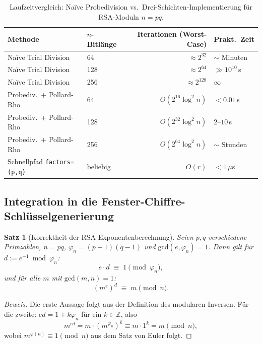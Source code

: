 ﻿\documentclass[12pt, a4paper]{article}
\theoremstyle{plain}
\newtheorem{theorem}{Satz}[section]
\theoremstyle{definition}
\theoremstyle{remark}
\newenvironment{myproof}[1][Beweis]{%
  \begin{proof}[#1]
}{%
  \end{proof}
}
\newcommand{\Z}{\mathbb{Z}}
\newcommand{\GCD}{\mathrm{gcd}}
\begin{document}
\begin{table}[H]
  \centering
  \caption{Laufzeitvergleich: Na\"ive Probedivision vs.\
           Drei-Schichten-Implementierung f\"ur RSA-Moduln $n = pq$.}
  \label{tab:phi_laufzeit}
  \begin{tabular}{llrl}
    \toprule
    Methode & $n$-Bitl\"ange & Iterationen (Worst-Case) & Prakt.\ Zeit \\
    \midrule
    Na\"ive Trial Division   & 64  & $\approx 2^{32}$ & $\sim$ Minuten \\
    Na\"ive Trial Division   & 128 & $\approx 2^{64}$ & $\gg 10^{10}$\,s \\
    Na\"ive Trial Division   & 256 & $\approx 2^{128}$ & $\infty$ \\
    \midrule
    Probediv.\ + Pollard-Rho & 64  & $O(2^{16} \log^2 n)$ & $< 0.01$\,s \\
    Probediv.\ + Pollard-Rho & 128 & $O(2^{32} \log^2 n)$ & $2$--$10$\,s \\
    Probediv.\ + Pollard-Rho & 256 & $O(2^{64} \log^2 n)$ & $\sim$ Stunden \\
    \midrule
    Schnellpfad \texttt{factors=(p,q)} & beliebig & $O(r)$ & $< 1\,\mu$s \\
    \bottomrule
  \end{tabular}
\end{table}

\subsection{Integration in die Fenster-Chiffre-Schl\"usselgenerierung}
\label{subsec:phi_integration}

\begin{theorem}[Korrektheit der RSA-Exponentenberechnung]
\label{thm:rsa_exponent_korrekt}
  Seien $p, q$ verschiedene Primzahlen, $n = pq$,
  $\varphi_n = (p-1)(q-1)$ und $\GCD(e, \varphi_n) = 1$.
  Dann gilt f\"ur $d := e^{-1} \bmod \varphi_n$:
  \[
    e \cdot d \;\equiv\; 1 \pmod{\varphi_n},
  \]
  und f\"ur alle $m$ mit $\GCD(m, n) = 1$:
  \[
    (m^e)^d \;\equiv\; m \pmod{n}.
  \]
\end{theorem}

\begin{myproof}
  Die erste Aussage folgt aus der Definition des modularen Inversen.
  F\"ur die zweite: $ed = 1 + k\varphi_n$ f\"ur ein $k \in \Z$, also
  \[
    m^{ed} = m \cdot (m^{\varphi_n})^k \equiv m \cdot 1^k = m \pmod{n},
  \]
  wobei $m^{\varphi(n)} \equiv 1 \pmod{n}$ aus dem Satz von Euler folgt.
\end{myproof}
\end{document}
